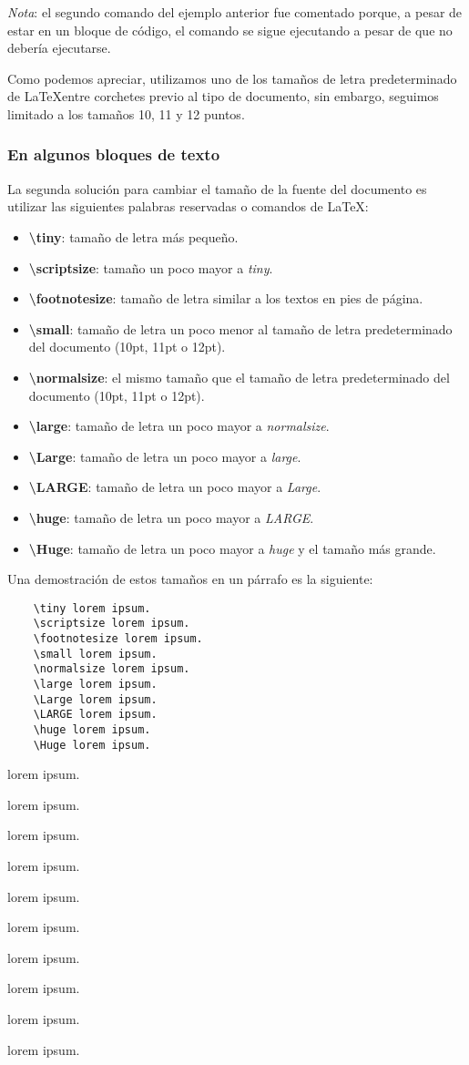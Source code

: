 \textit{Nota}: el segundo comando del ejemplo anterior fue comentado porque, a pesar de estar en un bloque de código, el comando se sigue ejecutando a pesar de que no debería ejecutarse.

Como podemos apreciar, utilizamos uno de los tamaños de letra predeterminado de \LaTeX entre corchetes previo al tipo de documento, sin embargo, seguimos limitado a los tamaños 10, 11 y 12 puntos.


\subsubsection{En algunos bloques de texto}

La segunda solución para cambiar el tamaño de la fuente del documento es utilizar las siguientes palabras reservadas o comandos de \LaTeX:
\begin{itemize}
    \item \textbf{\textbackslash{tiny}}: tamaño de letra más pequeño.
    \item \textbf{\textbackslash{scriptsize}}: tamaño un poco mayor a \textit{tiny}.
    \item \textbf{\textbackslash{footnotesize}}: tamaño de letra similar a los textos en pies de página.
    \item \textbf{\textbackslash{small}}: tamaño de letra un poco menor al tamaño de letra predeterminado del documento (10pt, 11pt o 12pt).
    \item \textbf{\textbackslash{normalsize}}: el mismo tamaño que el tamaño de letra predeterminado del documento (10pt, 11pt o 12pt).
    \item \textbf{\textbackslash{large}}: tamaño de letra un poco mayor a \textit{normalsize}.
    \item \textbf{\textbackslash{Large}}: tamaño de letra un poco mayor a \textit{large}.
    \item \textbf{\textbackslash{LARGE}}: tamaño de letra un poco mayor a \textit{Large}.
    \item \textbf{\textbackslash{huge}}: tamaño de letra un poco mayor a \textit{LARGE}.
    \item \textbf{\textbackslash{Huge}}: tamaño de letra un poco mayor a \textit{huge} y el tamaño más grande.
\end{itemize}

Una demostración de estos tamaños en un párrafo es la siguiente:
\begin{lstlisting}
    \tiny lorem ipsum.
    \scriptsize lorem ipsum.
    \footnotesize lorem ipsum.
    \small lorem ipsum.
    \normalsize lorem ipsum.
    \large lorem ipsum.
    \Large lorem ipsum.
    \LARGE lorem ipsum.
    \huge lorem ipsum.
    \Huge lorem ipsum.
\end{lstlisting}
\parbox{\textwidth}{\tiny lorem ipsum.}
\parbox{\textwidth}{\scriptsize lorem ipsum.}
\parbox{\textwidth}{\footnotesize lorem ipsum.}
\parbox{\textwidth}{\small lorem ipsum.}
\parbox{\textwidth}{\normalsize lorem ipsum.}
\parbox{\textwidth}{\large lorem ipsum.}
\parbox{\textwidth}{\Large lorem ipsum.}
\parbox{\textwidth}{\LARGE lorem ipsum.}
\parbox{\textwidth}{\huge lorem ipsum.}
\parbox{\textwidth}{\Huge lorem ipsum.}

